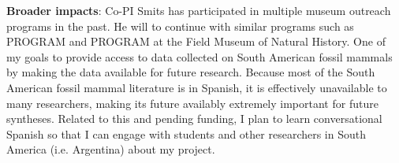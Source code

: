 \documentclass[11pt,letterpaper]{article}
\begin{document}
\textbf{Broader impacts}:
Co-PI Smits has participated in multiple museum outreach programs in the past. He will to continue with similar programs such as PROGRAM and PROGRAM at the Field Museum of Natural History. One of my goals to provide access to data collected on South American fossil mammals by making the data available for future research. Because most of the South American fossil mammal literature is in Spanish, it is effectively unavailable to many researchers, making its future availably extremely important for future syntheses. Related to this and pending funding, I plan to learn conversational Spanish so that I can engage with students and other researchers in South America (i.e. Argentina) about my project. 
\end{document}
